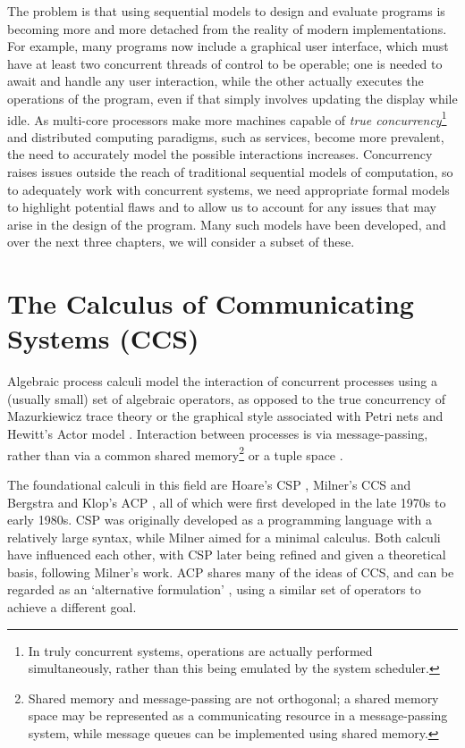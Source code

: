 The problem is that using sequential models to design and evaluate
programs is becoming more and more detached from the reality of modern
implementations.  For example, many programs now include a graphical
user interface, which must have at least two concurrent threads of
control to be operable; one is needed to await and handle any user
interaction, while the other actually executes the operations of the
program, even if that simply involves updating the display while idle.
As multi-core processors make more machines capable of \emph{true
  concurrency}\footnote{In truly concurrent systems, operations are
  actually performed simultaneously, rather than this being emulated
  by the system scheduler.} and distributed computing paradigms, such
as services, become more prevalent, the need to accurately model the
possible interactions increases.  Concurrency raises issues outside
the reach of traditional sequential models of computation, so to
adequately work with concurrent systems, we need appropriate formal
models to highlight potential flaws and to allow us to account for any
issues that may arise in the design of the program.  Many such models
have been developed, and over the next three chapters, we will
consider a subset of these.

\section{The Calculus of Communicating Systems (CCS)}
\label{ccs}

Algebraic process calculi model the interaction of concurrent
processes using a (usually small) set of algebraic operators, as
opposed to the true concurrency of Mazurkiewicz trace theory
\cite{maz:trace} or the graphical style associated with Petri nets
\cite{petri:phd} and Hewitt's Actor model \cite{hewitt:actor}.
Interaction between processes is via message-passing, rather than via
a common shared memory\footnote{Shared memory and message-passing are
  not orthogonal; a shared memory space may be represented as a
  communicating resource in a message-passing system, while message
  queues can be implemented using shared memory.} or a tuple space
\cite{linda}.

The foundational calculi in this field are Hoare's CSP
\cite{hoare:csp78}, Milner's CCS \cite{milner:ccs} and Bergstra and
Klop's ACP \cite{acp}, all of which were first developed in the late
1970s to early 1980s.  CSP was originally developed as a programming
language with a relatively large syntax, while Milner aimed for a
minimal calculus.  Both calculi have influenced each other, with CSP
later being refined and given a theoretical basis, following Milner's
work.  ACP shares many of the ideas of CCS, and can be regarded as an
`alternative formulation' \cite{acp}, using a similar set of operators
to achieve a different goal.

